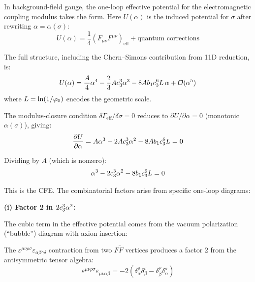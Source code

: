 In background-field gauge, the one-loop effective potential for the electromagnetic 
coupling modulus takes the form. Here $U(\alpha)$ is the induced potential for $\sigma$
after rewriting $\alpha=\alpha(\sigma)$:
\begin{equation}
    U(\alpha) = \frac{1}{4}(F_{\mu\nu}F^{\mu\nu})_{\text{eff}} 
        + \text{quantum corrections}
\end{equation}

The full structure, including the Chern--Simons contribution from 11D reduction, is:
\begin{equation}
    U(\alpha) = \frac{A}{4}\alpha^4 - \frac{2}{3}Ac_3^3\alpha^3 
        - 8Ab_1c_3^6 L\,\alpha + \mathcal{O}(\alpha^5)
    \label{eq:potential}
\end{equation}
where $L = \ln(1/\varphi_0)$ encodes the geometric scale.

The modulus-closure condition $\delta\Gamma_{\mathrm{eff}}/\delta\sigma=0$ reduces to
$\partial U/\partial\alpha = 0$ (monotonic $\alpha(\sigma)$), giving:
\begin{equation}
    \frac{\partial U}{\partial\alpha} = A\alpha^3 - 2Ac_3^3\alpha^2 
        - 8Ab_1c_3^6 L = 0
    \label{eq:stationarity}
\end{equation}

Dividing by $A$ (which is nonzero):
\begin{equation}
    \alpha^3 - 2c_3^3\alpha^2 - 8b_1c_3^6 L = 0
    \label{eq:CFE-appendix}
\end{equation}

This is the CFE. The combinatorial factors arise from specific one-loop diagrams:

\textbf{(i) Factor 2 in $2c_3^3\alpha^2$:}

The cubic term in the effective potential comes from the vacuum polarization 
(``bubble'') diagram with axion insertion:
\begin{center}
\end{center}
The $\varepsilon^{\mu\nu\rho\sigma}\varepsilon_{\alpha\beta\gamma\delta}$ contraction from two 
$F\tilde{F}$ vertices produces a factor 2 from the antisymmetric tensor algebra:
\begin{equation}
    \varepsilon^{\mu\nu\rho\sigma}\varepsilon_{\mu\nu\alpha\beta} = -2(\delta^\rho_\alpha\delta^\sigma_\beta - \delta^\rho_\beta\delta^\sigma_\alpha)
\end{equation}

